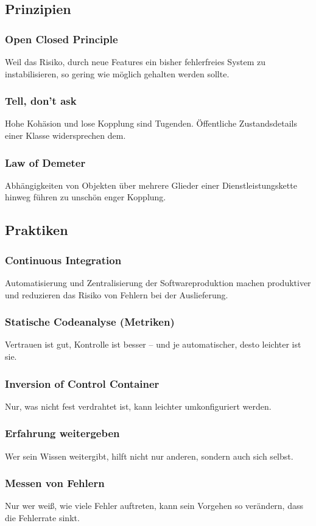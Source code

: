 \documentclass[a5paper, landscape,11pt]{article}
\begin{document}
	\newpage
	\begin{minipage}[t]{.5\textwidth}
		\subsection*{Prinzipien}
		\subsubsection*{Open Closed Principle}
		Weil das Risiko, durch neue Features ein bisher fehlerfreies System zu instabilisieren, so gering wie möglich gehalten werden sollte.
		\subsubsection*{Tell, don't ask}
		Hohe Kohäsion und lose Kopplung sind Tugenden. Öffentliche Zustandsdetails einer Klasse widersprechen dem.
		\subsubsection*{Law of Demeter}
		Abhängigkeiten von Objekten über mehrere Glieder einer Dienstleistungskette hinweg führen zu unschön enger Kopplung.	
	\end{minipage}
	\hspace{0.5cm}
	\begin{minipage}[t]{.5\textwidth}
		\subsection*{Praktiken}
		\subsubsection*{Continuous Integration}
		Automatisierung und Zentralisierung der Softwareproduktion machen produktiver und reduzieren das Risiko von Fehlern bei der Auslieferung.
		\subsubsection*{Statische Codeanalyse (Metriken)}
		Vertrauen ist gut, Kontrolle ist besser – und je automatischer, desto leichter ist sie.
		\subsubsection*{Inversion of Control Container}
		Nur, was nicht fest verdrahtet ist, kann leichter umkonfiguriert werden.
		\subsubsection*{Erfahrung weitergeben}
		Wer sein Wissen weitergibt, hilft nicht nur anderen, sondern auch sich selbst.
		\subsubsection*{Messen von Fehlern}
		Nur wer weiß, wie viele Fehler auftreten, kann sein Vorgehen so verändern, dass die Fehlerrate sinkt.
	\end{minipage}
\end{document}
